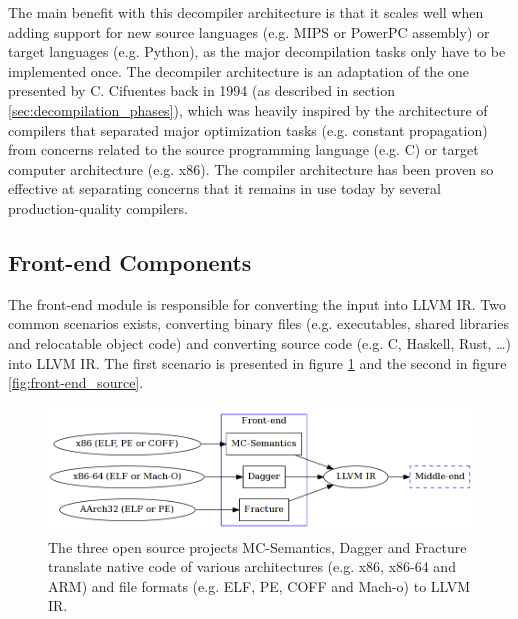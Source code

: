 
The main benefit with this decompiler architecture is that it scales well when adding support for new source languages (e.g. MIPS or PowerPC assembly) or target languages (e.g. Python), as the major decompilation tasks only have to be implemented once. The decompiler architecture is an adaptation of the one presented by C. Cifuentes back in 1994 (as described in section \ref{sec:decompilation_phases}), which was heavily inspired by the architecture of compilers that separated major optimization tasks (e.g. constant propagation) from concerns related to the source programming language (e.g. C) or target computer architecture (e.g. x86). The compiler architecture has been proven so effective at separating concerns that it remains in use today by several production-quality compilers. %


\subsection{Front-end Components}


The front-end module is responsible for converting the input into LLVM IR. Two common scenarios exists, converting binary files (e.g. executables, shared libraries and relocatable object code) and converting source code (e.g. C, Haskell, Rust, …) into LLVM IR. The first scenario is presented in figure \ref{fig:front-end_binary} and the second in figure \ref{fig:front-end_source}.


\begin{figure}[htbp]
	\begin{center}
		\includegraphics[width=\textwidth]{inc/front-end_binary.png}
		\caption{The three open source projects MC-Semantics, Dagger and Fracture translate native code of various architectures (e.g. x86, x86-64 and ARM) and file formats (e.g. ELF, PE, COFF and Mach-o) to LLVM IR.}
		\label{fig:front-end_binary}
	\end{center}
\end{figure}

